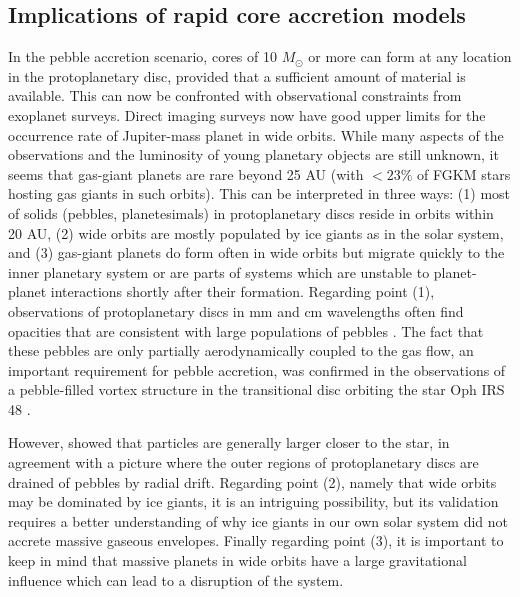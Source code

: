 \subsection{Implications of rapid core accretion models}
In the pebble accretion scenario, cores of 10 $M_\odot$ or more can form at any
location in the protoplanetary disc, provided that a sufficient amount of material
is available. This can now be confronted with observational constraints from
exoplanet surveys. Direct imaging surveys now have good upper limits for the
occurrence rate of Jupiter-mass planet in wide orbits.
While many aspects of the observations and the luminosity of young planetary
objects are still unknown, it seems that gas-giant planets are rare beyond 25
AU (with $<23\%$ of FGKM stars hosting gas giants in such orbits). This can be
interpreted in three ways: 
(1) most of solids (pebbles, planetesimals) in protoplanetary discs reside in orbits within 20 AU, 
(2)
wide orbits are mostly populated by ice giants as in the solar system, and 
(3)%
gas-giant planets do form often in wide orbits but migrate quickly to the inner planetary system or are parts of 
systems which are unstable to planet-planet interactions shortly after their formation.
Regarding point (1), observations of protoplanetary discs in mm and cm wavelengths often find opacities that are consistent with large populations of pebbles \citep[e.g.][]{Wilner2005, Rodmann2006,Lommen2007}.
The fact that these pebbles are only partially aerodynamically coupled to the
gas flow, an important requirement for pebble accretion, was confirmed in the
observations of a pebble-filled vortex structure in the transitional disc
orbiting the star Oph IRS 48 \citep{vanderMarel2013}.

However, \cite{Perez2012} showed that particles are generally larger closer to the star, in
agreement with a picture where the outer regions of protoplanetary discs are drained of pebbles by radial drift. 
Regarding point (2), namely that wide orbits may be dominated by ice giants, it is an intriguing possibility, but its validation requires a
better understanding of why ice giants in our own solar system did not accrete massive gaseous envelopes.
Finally regarding point (3), it is important to keep in mind that massive planets in wide orbits have a
large gravitational influence which can lead to a disruption of the system. 

